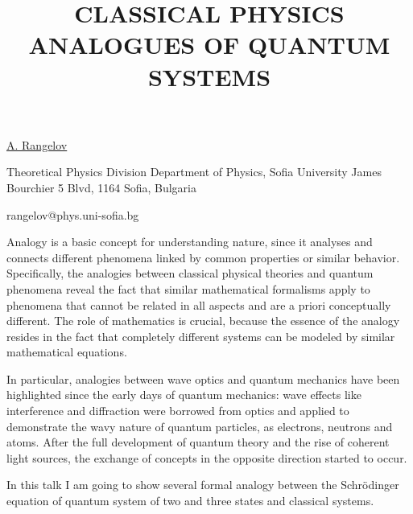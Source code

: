 \title{CLASSICAL PHYSICS ANALOGUES OF QUANTUM SYSTEMS}

\underline{A. Rangelov}  

{\normalsize{\vspace{-4mm}
Theoretical Physics Division
Department of Physics, Sofia University
James Bourchier 5 Blvd, 1164 Sofia, Bulgaria



\email rangelov@phys.uni-sofia.bg}}

Analogy is a basic concept for understanding nature, since it analyses and connects different phenomena linked by common properties or similar behavior. Specifically, the analogies between classical physical theories and quantum phenomena reveal the fact that similar mathematical formalisms apply to phenomena that cannot be related in all aspects and are a priori conceptually different. The role of mathematics is crucial, because the essence of the analogy resides in the fact that completely different systems can be modeled by similar mathematical equations.

In particular, analogies between wave optics and quantum mechanics have been highlighted since the early days of quantum mechanics: wave effects like interference and diffraction were borrowed from optics and applied to demonstrate the wavy nature of quantum particles, as electrons, neutrons and atoms. After the full development of quantum theory and the rise of coherent light sources, the exchange of concepts in the opposite direction started to occur.

In this talk I am going to show several formal analogy between the Schrödinger equation of quantum system of two and three states and classical systems.  


\vspace{\baselineskip}
